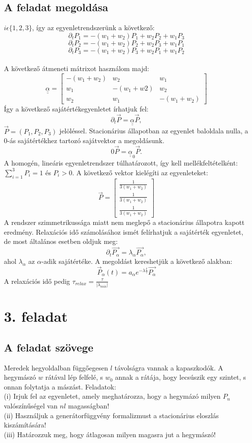 \documentclass[12pt]{article}
\def\doubleunderline#1{\underline{\underline{#1}}}
\begin{document}
\subsection*{A feladat megoldása}
$i  \epsilon  \{1, 2,3 \}$, így az egyenletrendszerünk a következő:
$$\partial_t P_1 = -(w_1 + w_2)P_1 + w_2P_2 + w_1P_3$$
$$\partial_t P_2 = -(w_1 + w_2)P_2 + w_2P_3 + w_1P_1$$
$$\partial_t P_3 = -(w_1 + w_2)P_3 + w_2P_1 + w_1P_2$$\\
A következő átmeneti mátrixot használom majd:
\[
\doubleunderline\alpha=
  \begin{bmatrix}
    -(w_1+w_2) & w_2 & w_1 \\
    w_1&-(w_1+w2)&w_2\\
    w_2&w_1&-(w_1 + w_2)
    
  \end{bmatrix}
\] Így a következő sajátértékegyenletet írhatjuk fel:
$$\partial _t\vec{P} =\doubleunderline\alpha  \vec{P},$$
$\vec{P} = (P_1, P_2, P_3)$ jelöléssel. Stacionárius állapotban az egyenlet baloldala nulla, a $0$-ás sajátértékhez tartozó sajátvektor a megoldásunk. 
$$0\vec{P} = \doubleunderline\alpha_0 \vec{P}.$$
A homogén, lineáris egyenletrendszer túlhatározott, így kell mellékfeltételként: $\sum^3_{i = 1}P_i = 1$ és $P_i> 0.$ A következő vektor kielégíti az egyenleteket:
\[
\vec{P}=
  \begin{bmatrix}
    \frac{1}{3(w_1+w_2)}\\
   \frac{1}{3(w_1+w_2)}\\
    \frac{1}{3(w_1+w_2)}
    
  \end{bmatrix}
\]
A rendszer szimmetrikussága miatt nem meglepő a stacionárius állapotra kapott eredmény. Relaxációs idő számolásához ismét felírhatjuk a sajátérték egyenletet, de most általános esetben oldjuk meg:
$$\partial _t \vec{P_\alpha} = \lambda_\alpha \vec{P_\alpha},$$ 
ahol $\lambda_\alpha $ az $\alpha$-adik sajátértéke. A megoldást kereshetjük a következő alakban:
$$\vec{P}_\alpha (t) = a_\alpha e^{-\lambda \frac{t}{\tau}}\vec{P_\alpha}$$
A relaxációs idő pedig $\tau_{relax} = \frac{\tau}{|\lambda_{min}|}$




\newpage
\section*{3. feladat}
\subsection*{A feladat szövege}
Meredek hegyoldalban függőegesen $l$ távolságra vannak a kapaszkodók. A hegymászó $w$ rátával lép felfelé, s $w_0$ annak a rátája, hogy lecsúszik egy szintet, s onnan folytatja a mászást.
Feladatok:\\
(i) Irjuk fel az egyenletet, amely meghatározza, hogy a hegymázó milyen $P_n$ valószínűségel van $nl$ magasságban!\\
(ii) Használjuk a generátorfüggvény formalizmust a stacionárius eloszlás kiszámítására!\\
 (iii) Határozzuk meg, hogy átlagosan milyen magasra jut a hegymászó!
\end{document}
